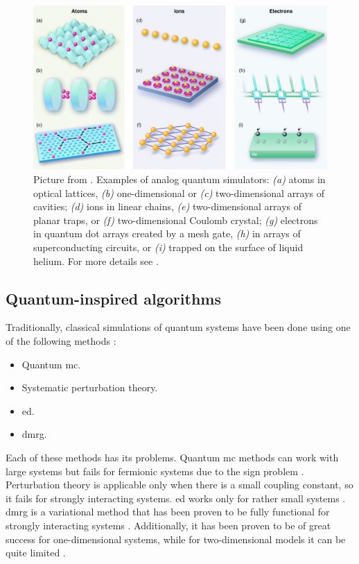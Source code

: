 \begin{figure}[t]
    \centering
    \includegraphics[width=\textwidth]{assets/figures/quantum_simulators.png}
    \caption[Examples of analog quantum simulators]{
        Picture from \cite{buluta2009simulators}.
        Examples of analog quantum simulators:
        \emph{(a)} atoms in optical lattices,
        \emph{(b)} one-dimensional or
        \emph{(c)} two-dimensional arrays of cavities;
        \emph{(d)} ions in linear chains,
        \emph{(e)} two-dimensional arrays of planar traps, or
        \emph{(f)} two-dimensional Coulomb crystal;
        \emph{(g)} electrons in quantum dot arrays created by a mesh gate,
        \emph{(h)} in arrays of superconducting circuits, or
        \emph{(i)} trapped on the surface of liquid helium.
        For more details see \cite{buluta2009simulators, georgescu2014simulation}.
    }
    \label{fig:analog_simulators}
\end{figure}


%
%
\subsection{Quantum-inspired algorithms}
\label{sub:quantum_inspired_algorithms}

Traditionally, classical simulations of quantum systems have been done using one of the following methods \cite{hauke2012simulators}:
\begin{itemize}[itemsep=0pt]
    \item Quantum \acf{mc}.
    \item Systematic perturbation theory.
    \item \Ac{ed}.
    \item \Ac{dmrg}.
\end{itemize}
Each of these methods has its problems.
Quantum \ac{mc} methods can work with large systems but fails for fermionic systems due to the sign problem \cite{sandvik2010computational, troyer2010computational}.
Perturbation theory is applicable only when there is a small coupling constant, so it fails for strongly interacting systems.
\Ac{ed} works only for rather small systems \cite{sandvik2010computational, troyer2010computational}.
\Ac{dmrg} is a variational method that has been proven to be fully functional for strongly interacting systems \cite{schollwock2011dmrg, mcculloch2007dmrg, dechiara2008dmrg}.
Additionally, it has been proven to be of great success for one-dimensional systems, while for two-dimensional models it can be quite limited \cite{stoudenmire2012dmrg}.

